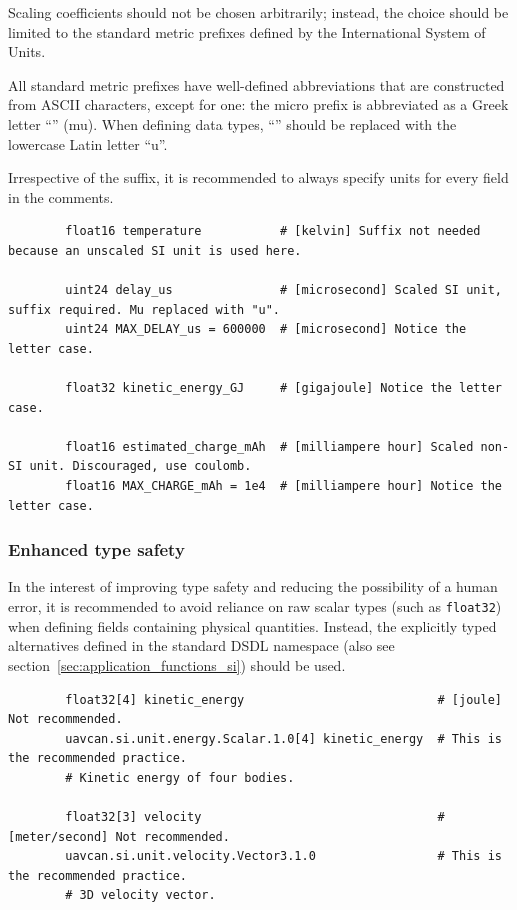 Scaling coefficients should not be chosen arbitrarily;
instead, the choice should be limited to the standard metric prefixes defined by the
International System of Units.

All standard metric prefixes have well-defined abbreviations that are constructed from ASCII characters,
except for one: the micro prefix is abbreviated as a Greek letter ``\textmu{}'' (mu).
When defining data types, ``\textmu{}'' should be replaced with the lowercase Latin letter ``u''.

Irrespective of the suffix, it is recommended to always specify units for every field in the comments.

\begin{remark}
    \begin{verbatim}
        float16 temperature           # [kelvin] Suffix not needed because an unscaled SI unit is used here.

        uint24 delay_us               # [microsecond] Scaled SI unit, suffix required. Mu replaced with "u".
        uint24 MAX_DELAY_us = 600000  # [microsecond] Notice the letter case.

        float32 kinetic_energy_GJ     # [gigajoule] Notice the letter case.

        float16 estimated_charge_mAh  # [milliampere hour] Scaled non-SI unit. Discouraged, use coulomb.
        float16 MAX_CHARGE_mAh = 1e4  # [milliampere hour] Notice the letter case.
    \end{verbatim}
\end{remark}

\subsubsection{Enhanced type safety}

In the interest of improving type safety and reducing the possibility of a human error,
it is recommended to avoid reliance on raw scalar types (such as \verb|float32|)
when defining fields containing physical quantities.
Instead, the explicitly typed alternatives defined in the standard DSDL namespace
 (also see section~\ref{sec:application_functions_si}) should be used.

\begin{remark}
    \begin{verbatim}
        float32[4] kinetic_energy                           # [joule] Not recommended.
        uavcan.si.unit.energy.Scalar.1.0[4] kinetic_energy  # This is the recommended practice.
        # Kinetic energy of four bodies.

        float32[3] velocity                                 # [meter/second] Not recommended.
        uavcan.si.unit.velocity.Vector3.1.0                 # This is the recommended practice.
        # 3D velocity vector.
    \end{verbatim}
\end{remark}
